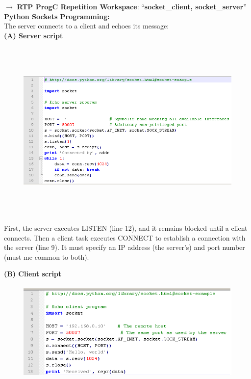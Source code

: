 $\rightarrow$ \textbf{ RTP ProgC Repetition Workspace}: ``\textbf{socket\_client, socket\_server}''\\

{\rot\bf Python Sockets Programming:}\\

The server connects to a client and echoes its message:\\

\textbf{(A) Server script }

 	\begin{figure}[h]
    \centering
    \includegraphics[width=16cm, height=9cm]{Images/image20.png}
    \label{fig:Fig }
    \end{figure}
   
First, the server executes LISTEN (line 12), and it remains blocked until a client connects. Then a client task executes CONNECT to establish a connection with the server (line 9). It must specify an IP address (the server's) and port number (must me common to both).\\
\newpage

\textbf{(B) Client script }

 	\begin{figure}[h]
    \centering
    \includegraphics[width=16cm, height=5cm]{Images/image118.png}
    \label{fig:Fig }
    \end{figure}

